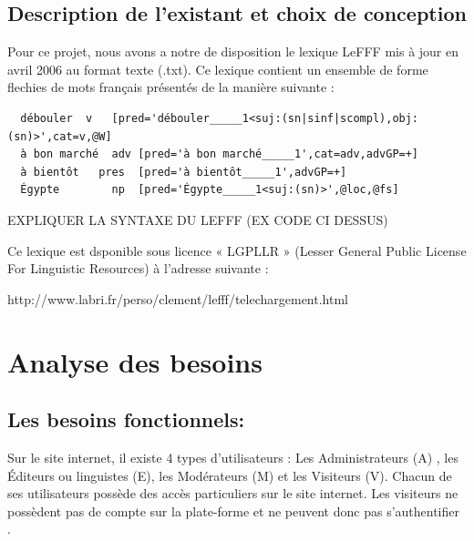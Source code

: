 \documentclass[12pt,a4paper]{article}
\begin{document}
\newpage
\subsection{Description de l'existant et choix de conception}

Pour ce projet, nous avons a notre de disposition le lexique LeFFF mis à jour en avril 2006 au format texte (.txt).
Ce lexique contient un ensemble de forme flechies de mots français présentés de la manière suivante :
\begin{verbatim}
  débouler	v	[pred='débouler_____1<suj:(sn|sinf|scompl),obj:(sn)>',cat=v,@W]
  à bon marché	adv	[pred='à bon marché_____1',cat=adv,advGP=+]
  à bientôt	  pres	[pred='à bientôt_____1',advGP=+]
  Égypte		np	[pred='Égypte_____1<suj:(sn)>',@loc,@fs]
\end{verbatim}

EXPLIQUER LA SYNTAXE DU LEFFF (EX CODE CI DESSUS)

Ce lexique est dsponible sous licence « LGPLLR » (Lesser General Public License For Linguistic Resources) à l'adresse suivante : 
\\ \begin{center}http://www.labri.fr/perso/clement/lefff/telechargement.html\end{center}

  \section{Analyse des besoins}

\subsection{Les besoins fonctionnels:}

Sur le site internet, il existe 4 types d’utilisateurs : Les Administrateurs (A) , les Éditeurs ou linguistes (E), les Modérateurs (M) et les Visiteurs (V).
Chacun de ses utilisateurs possède des accès particuliers sur le site internet.
Les visiteurs ne possèdent pas de compte sur la plate-forme et ne peuvent donc pas s'authentifier . 
\end{document}
